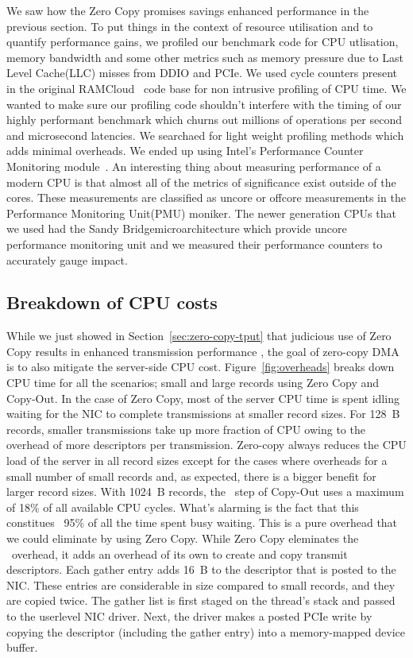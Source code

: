 We saw how the Zero Copy promises savings enhanced performance 
in the previous section. To put things in the context of resource utilisation and
 to quantify performance gains, we profiled our benchmark code for CPU utlisation, memory bandwidth 
 and some other metrics such as memory pressure due to Last Level Cache(LLC) misses from DDIO and PCIe.
We used cycle counters present in the original RAMCloud~\cite{ramcloud} code base for non intrusive profiling 
of CPU time.
We wanted to make sure our profiling code shouldn't interfere with the timing of our highly performant 
 benchmark which churns out millions of operations per second and microsecond latencies. 
 We searchaed for light weight profiling methods which adds minimal overheads.
 We ended up using Intel\textregistered's Performance Counter Monitoring module~\cite{intelpcm}. 
 An interesting thing about measuring performance 
 of a modern CPU is that almost all of the metrics of significance exist outside of the cores. These measurements 
 are classified as uncore or offcore measurements in the Performance Monitoring Unit(PMU) moniker.
 The newer generation CPUs that we used had the Sandy Bridge\textregistered microarchitecture which provide uncore performance 
 monitoring unit and we measured their performance counters to accurately gauge impact.


\subsection{Breakdown of CPU costs}
\label{sec:overhead}

While we just showed in Section~\ref{sec:zero-copy-tput} that judicious use of Zero Copy results in enhanced transmission performance
, the goal of zero-copy DMA is to also mitigate the server-side CPU cost. Figure~\ref{fig:overheads} breaks down
CPU time for all the scenarios; small and large records using Zero Copy and Copy-Out. In the case 
of Zero Copy, most of the server CPU time is spent idling waiting for the NIC 
to complete transmissions at smaller record sizes. For 128~B records,
smaller transmissions take up more fraction of CPU owing to the overhead of more descriptors
per transmission. Zero-copy always reduces the CPU load of the server in all record sizes except for the cases where
overheads for a small number of small records and, as expected, there is a bigger
benefit for larger record sizes. 
With 1024~B records, the \memcpy ~step of Copy-Out uses a maximum of 18\% of all available
CPU cycles. What's alarming is the fact that this constitues ~95\% of all the time spent busy waiting.
This is a pure overhead that we could eliminate by using Zero Copy. While Zero Copy eleminates the \memcpy ~overhead, it adds an overhead of its own to create and copy transmit descriptors.
Each gather entry adds 16~B to the descriptor that is posted to the NIC.
These entries are considerable in size compared to
small records, and they are copied twice. The gather list
is first staged on the thread's stack and passed to the userlevel NIC driver. Next,
the driver makes a posted PCIe write by copying the descriptor (including the
gather entry) into a memory-mapped device buffer.





